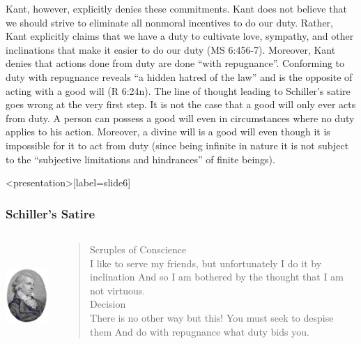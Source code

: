 Kant, however, explicitly denies these commitments. Kant does not believe that we should strive to eliminate all nonmoral incentives to do our duty. Rather, Kant explicitly claims that we have a duty to cultivate love, sympathy, and other inclinations that make it easier to do our duty (MS 6:456-7). Moreover, Kant denies that actions done from duty are done ``with repugnance''. Conforming to duty with repugnance reveals ``a hidden hatred of the law'' and is the opposite of acting with a good will (R 6:24n). The line of thought leading to Schiller's satire goes wrong at the very first step. It is not the case that a good will only ever acts from duty. A person can possess a good will even in circumstances where no duty applies to his action. Moreover, a divine will is a good will even though it is impossible for it to act from duty (since being infinite in nature it is not subject to the ``subjective limitations and hindrances'' of finite beings). \change

% 

\begin{frame}<presentation>[label=slide6]
    \frametitle{Schiller's Satire}
        \begin{columns}
            \begin{column}{3cm}
                \includegraphics[height=4cm]{../../graphics/schiller.jpg}
            \end{column}
            \begin{column}{7cm}
                \begin{quote}
                    \alert{Scruples of Conscience}\\
                	I like to serve my friends, but unfortunately I do it by inclination And so I am bothered by the thought that I am not virtuous.\\
                	\alert{Decision}\\
                	There is no other way but this! You must seek to despise them And do with repugnance what duty bids you.
                \end{quote}
            \end{column}
        \end{columns}
\end{frame}

